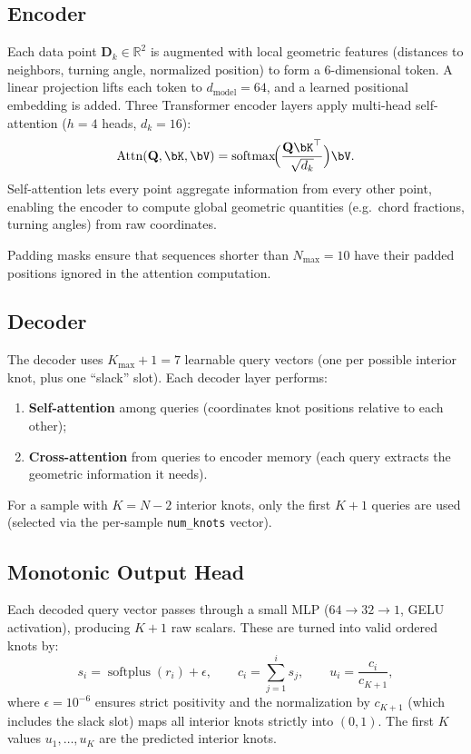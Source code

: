 \documentclass[11pt, a4paper]{article}
\newcommand{\R}{\mathbb{R}}
\newcommand{\bD}{\mathbf{D}}
\newcommand{\bQ}{\mathbf{Q}}
\DeclareMathOperator{\softplus}{softplus}
\DeclareMathOperator{\attn}{Attn}
\begin{document}
\subsection{Encoder}

Each data point $\bD_k \in \R^2$ is augmented with local geometric
features (distances to neighbors, turning angle, normalized position)
to form a 6-dimensional token. A linear projection lifts each token to
$d_{\text{model}} = 64$, and a learned positional embedding is added.
Three Transformer encoder layers apply multi-head self-attention
($h = 4$ heads, $d_k = 16$):
\begin{equation}
  \attn(\bQ, \bK, \bV) =
    \operatorname{softmax}\!\Bigl(\frac{\bQ\bK^\top}{\sqrt{d_k}}\Bigr)\bV.
  \label{eq:attention}
\end{equation}
Self-attention lets every point aggregate information from every other
point, enabling the encoder to compute global geometric quantities
(e.g.\ chord fractions, turning angles) from raw coordinates.

Padding masks ensure that sequences shorter than $N_{\max} = 10$ have
their padded positions ignored in the attention computation.


\subsection{Decoder}

The decoder uses $K_{\max} + 1 = 7$ learnable query vectors (one per
possible interior knot, plus one ``slack'' slot). Each decoder layer
performs:
\begin{enumerate}
  \item \textbf{Self-attention} among queries (coordinates knot positions
        relative to each other);
  \item \textbf{Cross-attention} from queries to encoder memory (each
        query extracts the geometric information it needs).
\end{enumerate}
For a sample with $K = N-2$ interior knots, only the first $K+1$ queries
are used (selected via the per-sample \texttt{num\_knots} vector).


\subsection{Monotonic Output Head}

Each decoded query vector passes through a small MLP
($64 \to 32 \to 1$, GELU activation), producing $K+1$ raw scalars.
These are turned into valid ordered knots by:
\begin{equation}
  s_i = \softplus(r_i) + \epsilon, \qquad
  c_i = \sum_{j=1}^{i} s_j, \qquad
  u_i = \frac{c_i}{c_{K+1}},
  \label{eq:output_head}
\end{equation}
where $\epsilon = 10^{-6}$ ensures strict positivity and the
normalization by $c_{K+1}$ (which includes the slack slot) maps all
interior knots strictly into $(0, 1)$. The first $K$ values
$u_1, \dots, u_K$ are the predicted interior knots.
\end{document}
